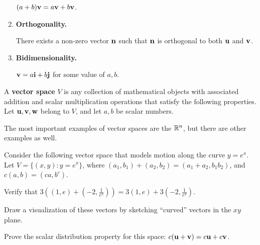 \begin{applicationActivities}{1}{8}
\begin{activity}{25}
\begin{multicols}{2}
\begin{enumerate}
        \((a+b)\mathbf v=a\mathbf v+b\mathbf v\).
  \item \textbf{Orthogonality.}

        There exists a non-zero vector \(\mathbf n\) such that
        \(\mathbf n\) is orthogonal to both \(\mathbf u\) and \(\mathbf v\).
  \item \textbf{Bidimensionality.}

        \(\mathbf v=a\mathbf i+b\mathbf j\) for some value of \(a,b\).
\end{enumerate}
\end{multicols}
\end{activity}

\begin{definition}
  A \textbf{vector space} \(V\) is any collection of mathematical objects with
  associated addition and scalar multiplication operations that satisfy
  the following properties. Let \(\mathbf u,\mathbf v,\mathbf w\) belong to \(V\),
  and let \(a,b\) be scalar numbers.

  \vectorSpaceProperties
\end{definition}

\begin{definition}
  The most important examples of vector spaces are the  \(\mathbb{R}^n\), but there are other examples as well.
\end{definition}

\begin{activity}{25}
  Consider the following vector space that models motion along the curve
  \(y=e^x\). Let \(V=\{(x,y):y=e^x\}\), where
  \((a_1,b_1)+(a_2,b_2)=(a_1+a_2,b_1b_2)\), and \(c(a,b)=(ca,b^c)\).

  \begin{subactivity}
    Verify that \(3((1,e)+(-2,\frac{1}{e^2}))=
    3(1,e)+3(-2,\frac{1}{e^2})\).
  \end{subactivity}

  \begin{TBLnote}
    Draw a visualization of these vectors by sketching ``curved''
    vectors in the \(xy\) plane.
  \end{TBLnote}

  \begin{subactivity}
    Prove the scalar distribution property for this space:
    \(c(\mathbf u+\mathbf v)=c\mathbf u+c\mathbf v\).
  \end{subactivity}
\end{activity}



\end{applicationActivities}
